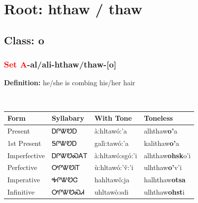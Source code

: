 \needspace{4in}
\section*{Root: hthaw / thaw}
\nopagebreak
{}
\needspace{3in}
\subsection*{Class: o}
\nopagebreak
\needspace{2in}
\subsubsection*{\textcolor{Red}{Set A}{-}al/ali{-}\textbf{hthaw/thaw}{-}[o]}
\nopagebreak
\textbf{Definition: } he/she is combing his/her hair
\\[0.5em]
\begin{tabularx}{\textwidth}{l X X X}%
\toprule%
\textbf{Form}&\textbf{Syllabary}&\textbf{With Tone}&\textbf{Toneless}\\%
\midrule%
Present&ᎠᎵᏔᏬᎠ&à:hltawó:’a&alhthaw\textbf{o'}a\\%
1st Present&ᎦᎵᏔᏬᎠ&galì:tawó:’a&kalithaw\textbf{o'}a\\%
Imperfective&ᎠᎵᏔᏬᏍᎪᎢ&à:hltawó:sgó:’i&alhthaw\textbf{ohsk}o'i\\%
Perfective&ᎤᎵᏔᏬᎥᎢ&ù:hltawó:’v̌:’i&ulhthaw\textbf{o'}v'i\\%
Imperative&ᎭᎵᏔᏬᏣ&hahltawǒ:ja&halhthaw\textbf{otsa}\\%
Infinitive&ᎤᎵᏔᏬᏍᏗ&uhltawò:sdi&ulhthaw\textbf{ohst}i\\%
\bottomrule%
\end{tabularx}
\\[1em]